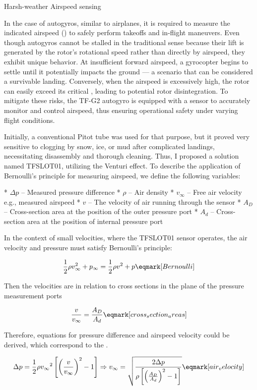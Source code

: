 \secc Harsh-weather Airspeed sensing

In the case of autogyros, similar to airplanes, it is required to measure the indicated airspeed () to safely perform takeoffs and in-flight maneuvers. Even though autogyros cannot be stalled in the traditional sense because their lift is generated by the rotor's rotational speed rather than directly by airspeed, they exhibit unique behavior. At insufficient forward airspeed, a gyrocopter begins to settle until it potentially impacts the ground — a scenario that can be considered a survivable landing. Conversely, when the airspeed is excessively high, the rotor can easily exceed its critical , leading to potential rotor disintegration. To mitigate these risks, the TF-G2 autogyro is equipped with a   sensor to accurately monitor and control airspeed, thus ensuring operational safety under varying flight conditions.

Initially, a conventional Pitot tube was used for that purpose, but it proved very sensitive to clogging by snow, ice, or mud after complicated landings, necessitating disassembly and thorough cleaning. Thus, I proposed a solution named TFSLOT01, utilizing the Venturi effect.  To describe the application of Bernoulli’s principle for measuring airspeed, we define the following variables:

\begitems
* $\Delta p$ -- Measured pressure difference
* $\rho$ -- Air density
* $v_\infty$ -- Free air velocity e.g., measured airspeed
* $v$ -- The velocity of air running through the sensor
* $A_D$ -- Cross-section area at the position of the outer pressure port
* $A_d$ -- Cross-section area at the position of internal pressure port
\enditems

In the context of small velocities, where the TFSLOT01 sensor operates, the air velocity and pressure must satisfy Bernoulli’s principle:

$$ {1 \over 2}\rho v_\infty^{2} + p_\infty = {1 \over 2}\rho v^{2} + p \eqmark[Bernoulli]$$

Then the velocities are in relation to cross sections in the plane of the pressure measurement ports

$$ {v \over v_\infty} = {A_D \over A_d} \eqmark[cross_section_areas]$$


Therefore, equations for pressure difference and airspeed velocity could be derived, which correspond to the .

$$
\Delta p = {1 \over 2}\rho{v_\infty}^{2}\left[\left({v \over v_\infty}\right)^2 - 1\right] \Rightarrow v_\infty = \sqrt{{2\Delta p \over \rho\left[\left({A_D \over A_d}\right)^2 - 1\right]}}
\eqmark[air_velocity]
$$


